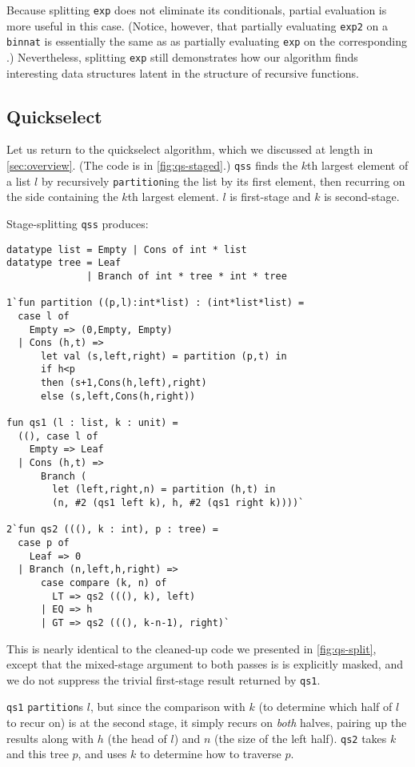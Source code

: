 Because splitting \texttt{exp} does not eliminate its conditionals, partial
evaluation is more useful in this case. (Notice, however, that partially
evaluating \texttt{exp2} on a \texttt{binnat} is essentially the same as as
partially evaluating \texttt{exp} on the corresponding \rmint.) Nevertheless,
splitting \texttt{exp} still demonstrates how our algorithm finds interesting
data structures latent in the structure of recursive functions.

\subsection{Quickselect}
\label {sec:exampleQS}

Let us return to the quickselect algorithm, which we discussed at
length in \ref{sec:overview}. (The code is in \ref{fig:qs-staged}.)
\texttt{qss} finds the $k$th largest element of a list $l$ by
recursively \texttt{partition}ing the list by its first element, then recurring
on the side containing the $k$th largest element. $l$ is first-stage and $k$ is
second-stage.

Stage-splitting \texttt{qss} produces:
%
\begin{lstlisting} 
datatype list = Empty | Cons of int * list
datatype tree = Leaf
              | Branch of int * tree * int * tree

1`fun partition ((p,l):int*list) : (int*list*list) = 
  case l of 
    Empty => (0,Empty, Empty) 
  | Cons (h,t) => 
      let val (s,left,right) = partition (p,t) in 
      if h<p 
      then (s+1,Cons(h,left),right) 
      else (s,left,Cons(h,right))

fun qs1 (l : list, k : unit) = 
  ((), case l of
    Empty => Leaf
  | Cons (h,t) => 
      Branch (
        let (left,right,n) = partition (h,t) in
        (n, #2 (qs1 left k), h, #2 (qs1 right k))))`

2`fun qs2 (((), k : int), p : tree) = 
  case p of
    Leaf => 0
  | Branch (n,left,h,right) =>
      case compare (k, n) of 
        LT => qs2 (((), k), left) 
      | EQ => h 
      | GT => qs2 (((), k-n-1), right)`
\end{lstlisting}
%
This is nearly identical to the cleaned-up code we presented in
\ref{fig:qs-split}, except that the mixed-stage argument to both passes is
is explicitly masked, and we do not suppress the trivial first-stage result
returned by \texttt{qs1}.

\texttt{qs1} \texttt{partition}s $l$, but since the comparison with $k$ (to
determine which half of $l$ to recur on) is at the second stage, it simply
recurs on \emph{both} halves, pairing up the results along with $h$ (the head of
$l$) and $n$ (the size of the left half). \texttt{qs2} takes $k$ and this tree
$p$, and uses $k$ to determine how to traverse $p$.

